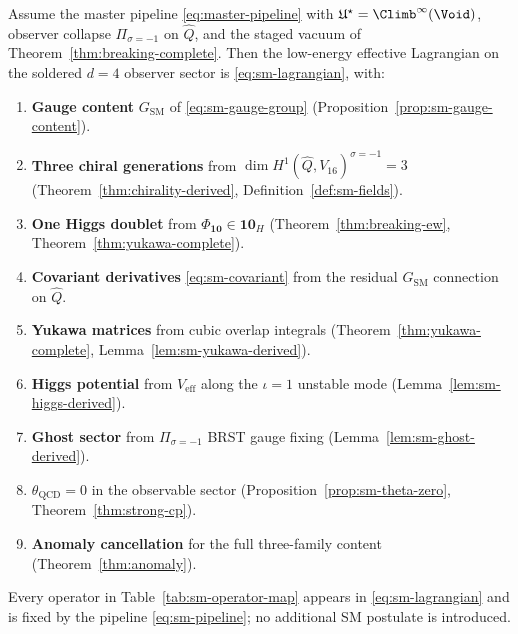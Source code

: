 \begin{theorem}
\label{thm:sm-lagrangian-derived}
Assume the master pipeline \eqref{eq:master-pipeline} with
$\mathfrak{U}^\star=\Climb^\infty(\Void)$, observer collapse
$\Pi_{\sigma=-1}$ on $\hat Q$, and the staged vacuum of
Theorem~\ref{thm:breaking-complete}. Then the low-energy effective Lagrangian
on the soldered $d=4$ observer sector is \eqref{eq:sm-lagrangian}, with:
\begin{enumerate}[label=\textbf{(\roman*)},leftmargin=*]
  \item \textbf{Gauge content} $G_{\mathrm{SM}}$ of
    \eqref{eq:sm-gauge-group} (Proposition~\ref{prop:sm-gauge-content}).
  \item \textbf{Three chiral generations} from
    $\dim H^1(\hat Q,V_{16})^{\sigma=-1}=3$
    (Theorem~\ref{thm:chirality-derived}, Definition~\ref{def:sm-fields}).
  \item \textbf{One Higgs doublet} from $\Phi_{\mathbf{10}}\in\mathbf{10}_H$
    (Theorem~\ref{thm:breaking-ew}, Theorem~\ref{thm:yukawa-complete}).
  \item \textbf{Covariant derivatives} \eqref{eq:sm-covariant} from the
    residual $G_{\mathrm{SM}}$ connection on $\hat Q$.
  \item \textbf{Yukawa matrices} from cubic overlap integrals
    (Theorem~\ref{thm:yukawa-complete}, Lemma~\ref{lem:sm-yukawa-derived}).
  \item \textbf{Higgs potential} from $V_{\mathrm{eff}}$ along the
    $\iota=1$ unstable mode (Lemma~\ref{lem:sm-higgs-derived}).
  \item \textbf{Ghost sector} from $\Pi_{\sigma=-1}$ BRST gauge fixing
    (Lemma~\ref{lem:sm-ghost-derived}).
  \item \textbf{$\theta_{\mathrm{QCD}}=0$} in the observable sector
    (Proposition~\ref{prop:sm-theta-zero}, Theorem~\ref{thm:strong-cp}).
  \item \textbf{Anomaly cancellation} for the full three-family content
    (Theorem~\ref{thm:anomaly}).
\end{enumerate}
Every operator in Table~\ref{tab:sm-operator-map} appears in
\eqref{eq:sm-lagrangian} and is fixed by the pipeline
\eqref{eq:sm-pipeline}; no additional SM postulate is introduced.
\end{theorem}

